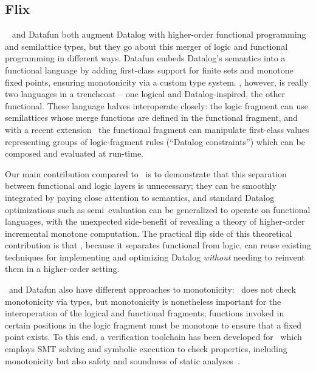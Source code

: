 

\subsection{Flix}
\label{section-flix}

\Flix~\citep{flix} and Datafun both augment Datalog with higher-order functional programming and semilattice types,  but they go about this merger of logic and functional programming in different ways. Datafun embeds Datalog's semantics into a functional language by adding first-class support for finite sets and monotone fixed points, ensuring monotonicity via a custom type system. \Flix, however, is really two languages in a trenchcoat -- one logical and Datalog-inspired, the other functional. These language halves interoperate closely: the logic fragment can use semilattices whose merge functions are defined in the functional fragment, and with a recent extension~\citep{DBLP:journals/pacmpl/MadsenL20} the functional fragment can manipulate first-class values representing groups of logic-fragment rules (``Datalog constraints'') which can be composed and evaluated at run-time.

Our main contribution compared to \flix\ is to demonstrate that this separation
between functional and logic layers is unnecessary; they can be smoothly
integrated by paying close attention to semantics, and standard Datalog
optimizations such as semi\naive\ evaluation can be generalized to operate on
functional languages, with the unexpected side-benefit of revealing a theory of
higher-order incremental monotone computation.
%
The practical flip side of this theoretical contribution is that \flix, because it separates functional from logic, can reuse existing techniques for implementing and optimizing Datalog \emph{without} needing to reinvent them in a higher-order setting.

\Flix\ and Datafun also have different approaches to monotonicity: \flix\ does not check monotonicity via types, but monotonicity is nonetheless important for the interoperation of the logical and functional fragments; functions invoked in certain positions in the logic fragment must be monotone to ensure that a fixed point exists.
%
To this end, a verification toolchain has been developed for \flix\ which employs SMT solving and symbolic execution to check properties, including monotonicity but also safety and soundness of static analyses~\citep{DBLP:conf/issta/MadsenL18}.

